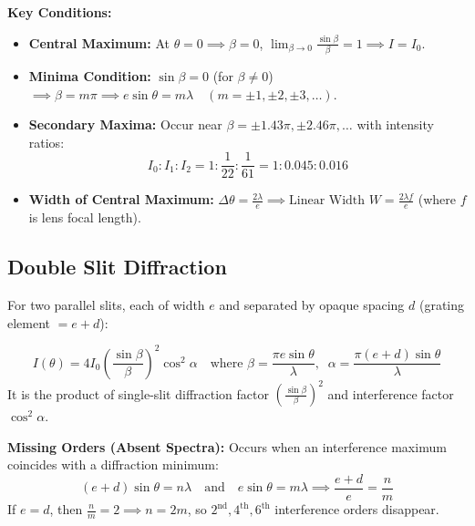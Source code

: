 \documentclass[12pt,a4paper]{article}
\begin{document}
\textbf{Key Conditions:}\par\noindent
\begin{itemize}[leftmargin=*, itemsep=3pt]
  \item \textbf{Central Maximum:} At $\theta = 0 \implies \beta = 0$, $\lim_{\beta\to 0} \frac{\sin\beta}{\beta} = 1 \implies I = I_0$.
  \item \textbf{Minima Condition:} $\sin \beta = 0$ (for $\beta \neq 0$) $\implies \beta = m \pi \implies e \sin \theta = m \lambda \quad (m = \pm 1, \pm 2, \pm 3, \ldots)$.
  \item \textbf{Secondary Maxima:} Occur near $\beta = \pm 1.43 \pi, \pm 2.46 \pi, \dots$ with intensity ratios:
  \begin{equation}
  I_0 : I_1 : I_2 = 1 : \frac{1}{22} : \frac{1}{61} = 1 : 0.045 : 0.016
  \end{equation}
  \item \textbf{Width of Central Maximum:} $\Delta \theta = \frac{2 \lambda}{e} \implies \text{Linear Width } W = \frac{2 \lambda f}{e}$ (where $f$ is lens focal length).
\end{itemize}

\subsection{Double Slit Diffraction}

For two parallel slits, each of width $e$ and separated by opaque spacing $d$ (grating element $= e + d$):

\begin{tcolorbox}[formulabox, title={\textbf{Double Slit Intensity Formula}}]
\begin{equation}
I(\theta) = 4 I_0 \left(\frac{\sin \beta}{\beta}\right)^2 \cos^2 \alpha \quad \text{where } \beta = \frac{\pi e \sin \theta}{\lambda}, \;\; \alpha = \frac{\pi (e+d) \sin \theta}{\lambda}
\end{equation}
It is the product of single-slit diffraction factor $\left(\frac{\sin\beta}{\beta}\right)^2$ and interference factor $\cos^2\alpha$.
\end{tcolorbox}

\textbf{Missing Orders (Absent Spectra):} Occurs when an interference maximum coincides with a diffraction minimum:
\begin{equation}
(e+d)\sin\theta = n \lambda \quad \text{and} \quad e\sin\theta = m \lambda \implies \frac{e+d}{e} = \frac{n}{m}
\end{equation}
If $e = d$, then $\frac{n}{m} = 2 \implies n = 2m$, so $2^{\text{nd}}, 4^{\text{th}}, 6^{\text{th}}$ interference orders disappear.
\end{document}
